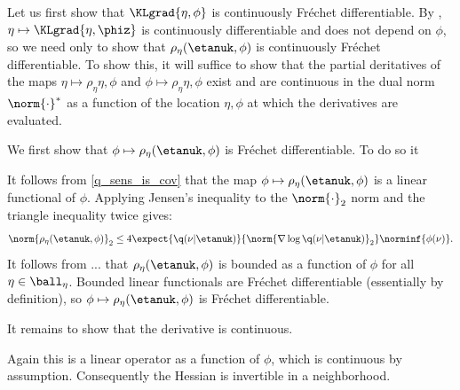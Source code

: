 Let us first show that $\KLgrad{\eta, \phi}$ is continuously Fr{\'e}chet
differentiable.  By , $\eta \mapsto
\KLgrad{\eta, \phiz}$ is continuously differentiable and does not depend on
$\phi$, so we need only to show that $\rho_\eta(\etanuk, \phi)$ is continuously
Fr{\'e}chet differentiable. To show this, it will suffice to show that the
partial deritatives of the maps $\eta \mapsto \rho_\eta{\eta, \phi}$ and $\phi
\mapsto \rho_\eta{\eta, \phi}$ exist and are continuous in the dual norm
$\norm{\cdot}^*$ as a function of the location $\eta, \phi$ at which the
derivatives are evaluated.

We first show that $\phi \mapsto \rho_\eta(\etanuk, \phi)$ is Fr{\'e}chet
differentiable.  To do so it


It follows from \eqref{q_sens_is_cov} that the map $\phi \mapsto
\rho_\eta(\etanuk, \phi)$ is a linear functional of $\phi$.  Applying Jensen's
inequality to the $\norm{\cdot}_2$ norm and the triangle inequality twice gives:
%
\begin{align*}
%
\norm{\rho_\eta(\etanuk, \phi)}_2 \le
    4 \expect{\q(\nu \vert \etanuk)}
             {\norm{\nabla \log \q(\nu \vert \etanuk)}_2}
              \norminf{\phi(\nu)}.
%
\end{align*}
%
It follows from ... that $\rho_\eta(\etanuk,
\phi)$ is bounded as a function of $\phi$ for all $\eta \in \ball_\eta$.
Bounded linear functionals are Fr{\'e}chet differentiable (essentially by
definition), so $\phi \mapsto \rho_\eta(\etanuk, \phi)$ is Fr{\'e}chet
differentiable.

It remains to show that the derivative is continuous.

%
Again this is a linear operator as a function of $\phi$, which is continuous by
assumption.  Consequently the Hessian is invertible in a neighborhood.

